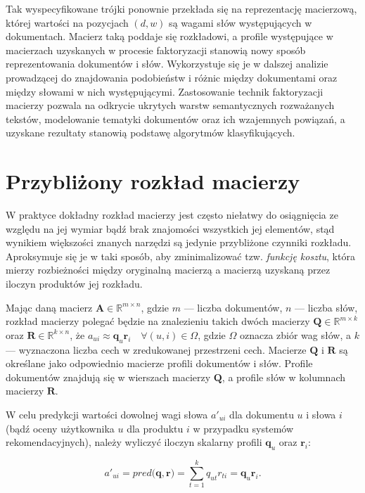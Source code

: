 \documentclass{pracamgr}
\begin{document}
Tak wyspecyfikowane trójki ponownie przekłada się na reprezentację macierzową, której wartości na pozycjach $(d, w)$ są wagami słów występujących w dokumentach. Macierz taką poddaje się rozkładowi, a profile występujące w macierzach uzyskanych w procesie faktoryzacji stanowią nowy sposób reprezentowania dokumentów i słów. Wykorzystuje się je w dalszej analizie prowadzącej do znajdowania podobieństw i różnic między dokumentami oraz między słowami w nich występującymi. Zastosowanie technik faktoryzacji macierzy pozwala na odkrycie ukrytych warstw semantycznych rozważanych tekstów, modelowanie tematyki dokumentów oraz ich wzajemnych powiązań, a uzyskane rezultaty stanowią podstawę algorytmów klasyfikujących.

\section{Przybliżony rozkład macierzy} \label{matrix_approx}
W praktyce dokładny rozkład macierzy jest często niełatwy do osiągnięcia ze względu na jej wymiar bądź brak znajomości wszystkich jej elementów, stąd wynikiem większości znanych narzędzi są jedynie przybliżone czynniki rozkładu. Aproksymuje się je w taki sposób, aby zminimalizować tzw. \textit{funkcję kosztu}, która mierzy rozbieżności między oryginalną macierzą a macierzą uzyskaną przez iloczyn produktów jej rozkładu.

Mając daną macierz $\mathbf{A} \in \mathbb{R}^{m \times n}$, gdzie $m$ --- liczba dokumentów, $n$ --- liczba słów, rozkład macierzy polegać będzie na znalezieniu takich dwóch macierzy $\mathbf{Q} \in \mathbb{R}^{m \times k}$ oraz $\mathbf{R} \in \mathbb{R}^{k \times n}$, że $a_{ui} \approx \mathbf{q}_{u} \mathbf{r}_{i} \quad \forall (u, i) \in \Omega$, gdzie $\Omega$ oznacza zbiór wag słów, a $k$ --- wyznaczona liczba cech w zredukowanej przestrzeni cech. Macierze $\mathbf{Q}$ i $\mathbf{R}$ są określane jako odpowiednio macierze profili dokumentów i słów. Profile dokumentów znajdują się w wierszach macierzy $\mathbf{Q}$, a profile słów w kolumnach macierzy $\mathbf{R}$.

W celu predykcji wartości dowolnej wagi słowa $a'_{ui}$ dla dokumentu $u$ i słowa $i$ (bądź oceny użytkownika $u$ dla produktu $i$ w przypadku systemów rekomendacyjnych), należy wyliczyć iloczyn skalarny profili $\mathbf{q}_{u}$ oraz $\mathbf{r}_{i}$:

\[
a'_{ui} = pred(\mathbf{q}, \mathbf{r)} = \sum_{t=1}^{k} q_{ut} r_{ti} = \mathbf{q}_{u} \mathbf{r}_{i}.
\]
\end{document}
